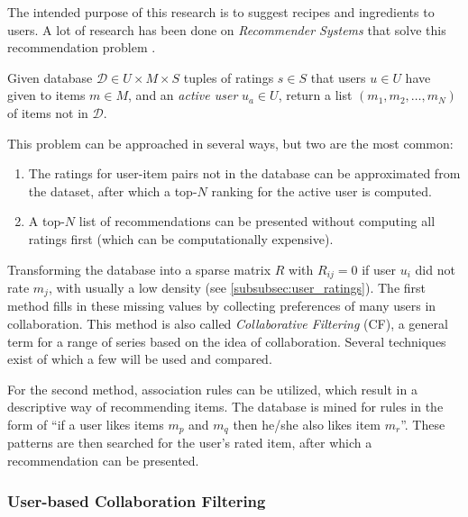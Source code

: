 The intended purpose of this research is to suggest recipes and ingredients to users.
A lot of research has been done on \emph{Recommender Systems} that solve this recommendation problem \citep{Ricci2010}.

\begin{definition}
	Given database $\mathcal{D} \in U \times M \times S$ tuples of ratings $s\in S$ that users $u \in U$ have given to items $m \in M$, and an \emph{active user} $u_a \in U$, return a list $(m_1, m_2, \dots, m_N)$ of items not in $\mathcal{D}$.
\end{definition}

This problem can be approached in several ways, but two are the most common:

\begin{enumerate}
	\item The ratings for user-item pairs not in the database can be approximated from the dataset, after which a top-$N$ ranking for the active user is computed.
	\item A top-$N$ list of recommendations can be presented without computing all ratings first (which can be computationally expensive).
\end{enumerate}

Transforming the database into a sparse matrix $R$ with $R_{ij}=0$ if user $u_i$ did not rate $m_j$, with usually a low density (see \cref{subsubsec:user_ratings}).
The first method fills in these missing values by collecting preferences of many users in collaboration.
This method is also called \emph{Collaborative Filtering} (CF), a general term for a range of series based on the idea of collaboration.
Several techniques exist of which a few will be used and compared.

For the second method, association rules can be utilized, which result in a descriptive way of recommending items.
The database is mined for rules in the form of ``if a user likes items $m_p$ and $m_q$ then he/she also likes item $m_r$''.
These patterns are then searched for the user's rated item, after which a recommendation can be presented.




\subsubsection{User-based Collaboration Filtering}
\label{subsubsec:user_based_cf}

